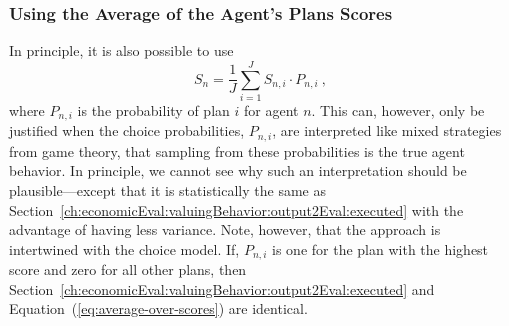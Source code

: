 %

\subsubsection{Using the Average of the Agent's Plans Scores}
\label{ch:economicEval:valuingBehavior:output2Eval:average}
In principle, it is also possible to use
%
\begin{equation}
S_n = \frac{1}{J} \sum_{i=1}^J S_{n,i} \cdot P_{n,i} \ ,
\label{eq:average-over-scores}
\end{equation}
%
where $P_{n,i}$ is the probability of plan $i$ for agent $n$. This can, however, only be justified when the choice probabilities, $P_{n,i}$, are interpreted like mixed strategies from game theory, \ie that sampling from these probabilities is the true agent behavior.  In principle, we cannot see why such an interpretation should be plausible---except that it is statistically the same as Section~\ref{ch:economicEval:valuingBehavior:output2Eval:executed} with the advantage of having less variance.  Note, however, that the approach is intertwined with the choice model. If, \eg $P_{n,i}$ is one for the plan with the highest score and zero for all other plans, then Section~\ref{ch:economicEval:valuingBehavior:output2Eval:executed} and Equation~(\ref{eq:average-over-scores}) are identical.  

